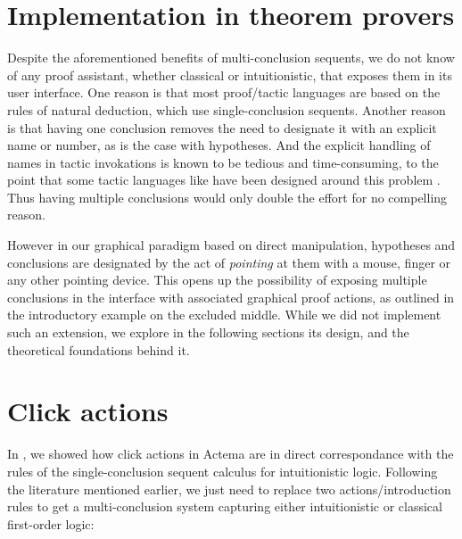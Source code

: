 \section{Implementation in theorem provers}

Despite the aforementioned benefits of multi-conclusion sequents, we do not know
of any proof assistant, whether classical or intuitionistic, that exposes them
in its user interface. One reason is that most proof/tactic languages are based
on the rules of natural deduction, which use single-conclusion sequents. Another
reason is that having one conclusion removes the need to designate it with an
explicit name or number, as is the case with hypotheses. And the explicit handling
of names in tactic invokations is known to be tedious and time-consuming, to the
point that some tactic languages like \ssreflect have been designed around this
problem . Thus having multiple conclusions would only double the
effort for no compelling reason.

However in our graphical paradigm based on direct manipulation, hypotheses and
conclusions are designated by the act of \emph{pointing} at them with a mouse,
finger or any other pointing device. This opens up the possibility of exposing
multiple conclusions in the interface with associated graphical proof actions,
as outlined in the introductory example on the excluded middle. While we did not
implement such an extension, we explore in the following sections its design,
and the theoretical foundations behind it.

\section{Click actions}

In , we showed how click actions in Actema are in direct
correspondance with the rules of the single-conclusion sequent calculus 
for intuitionistic logic. Following the literature mentioned earlier, we just
need to replace two actions/introduction rules to get a multi-conclusion system
capturing either intuitionistic or classical first-order logic:

